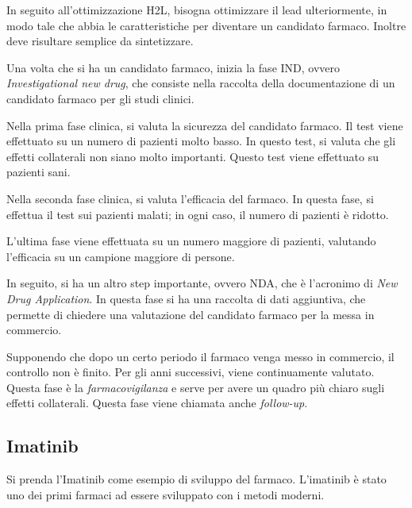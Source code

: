 
\clearpage

In seguito all'ottimizzazione H2L, bisogna ottimizzare il lead
ulteriormente, in modo tale che abbia le caratteristiche per diventare
un candidato farmaco. Inoltre deve risultare semplice da sintetizzare.

Una volta che si ha un candidato farmaco, inizia la fase IND, ovvero
\emph{Investigational new drug}, che consiste nella raccolta della
documentazione di un candidato farmaco per gli studi clinici.

\begingroup{} \endgroup

Nella prima fase clinica, si valuta la sicurezza del candidato farmaco.
Il test viene effettuato su un numero di pazienti molto basso. In questo
test, si valuta che gli effetti collaterali non siano molto importanti.
Questo test viene effettuato su pazienti sani.

Nella seconda fase clinica, si valuta l'efficacia del farmaco. In questa
fase, si effettua il test sui pazienti malati; in ogni caso, il numero
di pazienti è ridotto.

L'ultima fase viene effettuata su un numero maggiore di pazienti,
valutando l'efficacia su un campione maggiore di persone.

In seguito, si ha un altro step importante, ovvero NDA, che è l'acronimo
di \emph{New Drug Application}. In questa fase si ha una raccolta di
dati aggiuntiva, che permette di chiedere una valutazione del candidato
farmaco per la messa in commercio.

Supponendo che dopo un certo periodo il farmaco venga messo in
commercio, il controllo non è finito. Per gli anni successivi, viene
continuamente valutato. Questa fase è la \emph{farmacovigilanza} e serve
per avere un quadro più chiaro sugli effetti collaterali. Questa fase
viene chiamata anche \emph{follow-up}.


\subsection{Imatinib}

Si prenda l'Imatinib come esempio di sviluppo del farmaco. L'imatinib è
stato uno dei primi farmaci ad essere sviluppato con i metodi moderni.

